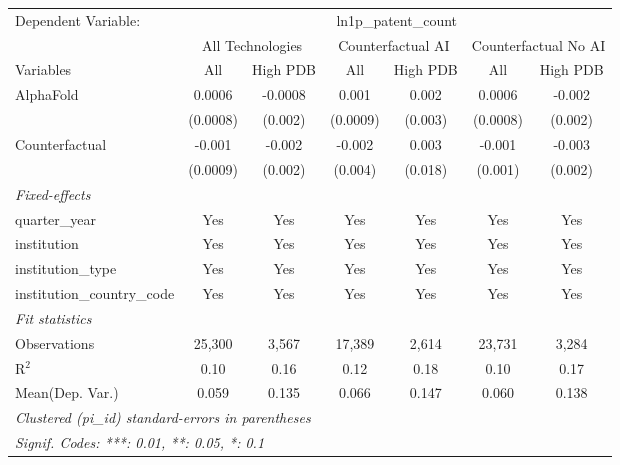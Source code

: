 \begingroup
\centering
\begin{tabular}{lcccccc}
   \tabularnewline \midrule \midrule
   Dependent Variable: & \multicolumn{6}{c}{ln1p\_patent\_count}\\
 & \multicolumn{2}{c}{All Technologies} & \multicolumn{2}{c}{Counterfactual AI} & \multicolumn{2}{c}{Counterfactual No AI} \\
\cmidrule(lr){1-1}\cmidrule(lr){2-3} \cmidrule(lr){4-5} \cmidrule(lr){6-7}
Variables & \multicolumn{1}{c}{All} & \multicolumn{1}{c}{High PDB} & \multicolumn{1}{c}{All} & \multicolumn{1}{c}{High PDB} & \multicolumn{1}{c}{All} & \multicolumn{1}{c}{High PDB} \\
\cmidrule(lr){1-1}\cmidrule(lr){2-2} \cmidrule(lr){3-3} \cmidrule(lr){4-4} \cmidrule(lr){5-5} \cmidrule(lr){6-6} \cmidrule(lr){7-7}
   AlphaFold                    & 0.0006   & -0.0008 & 0.001    & 0.002   & 0.0006   & -0.002\\   
                                & (0.0008) & (0.002) & (0.0009) & (0.003) & (0.0008) & (0.002)\\   
   Counterfactual               & -0.001   & -0.002  & -0.002   & 0.003   & -0.001   & -0.003\\   
                                & (0.0009) & (0.002) & (0.004)  & (0.018) & (0.001)  & (0.002)\\   
   \midrule
   \emph{Fixed-effects}\\
   quarter\_year                & Yes      & Yes     & Yes      & Yes     & Yes      & Yes\\  
   institution                  & Yes      & Yes     & Yes      & Yes     & Yes      & Yes\\  
   institution\_type            & Yes      & Yes     & Yes      & Yes     & Yes      & Yes\\  
   institution\_country\_code   & Yes      & Yes     & Yes      & Yes     & Yes      & Yes\\  
   \midrule
   \emph{Fit statistics}\\
   Observations                 & 25,300   & 3,567   & 17,389   & 2,614   & 23,731   & 3,284\\  
   R$^2$                        & 0.10     & 0.16    & 0.12     & 0.18    & 0.10     & 0.17\\  
Mean(Dep. Var.) & 0.059 & 0.135 & 0.066 & 0.147 & 0.060 & 0.138 \\
   \midrule \midrule
   \multicolumn{7}{l}{\emph{Clustered (pi\_id) standard-errors in parentheses}}\\
   \multicolumn{7}{l}{\emph{Signif. Codes: ***: 0.01, **: 0.05, *: 0.1}}\\
\end{tabular}
\par\endgroup
